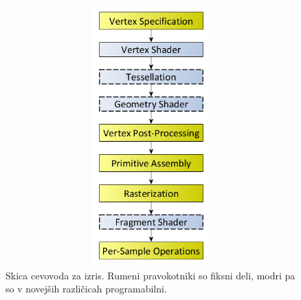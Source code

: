 \documentclass[a4paper, 12pt]{book}
\begin{document}
\begin{figure}[h]
\begin{center}
\includegraphics[width=12cm, height=10cm, keepaspectratio=true]{File_RenderingPipeline.png}
\end{center}
\caption{Skica cevovoda za izris. Rumeni pravokotniki so fiksni deli, modri pa so v novejših različicah programabilni.}
\label{filerenderingpipeline}
\end{figure}
\end{document}
